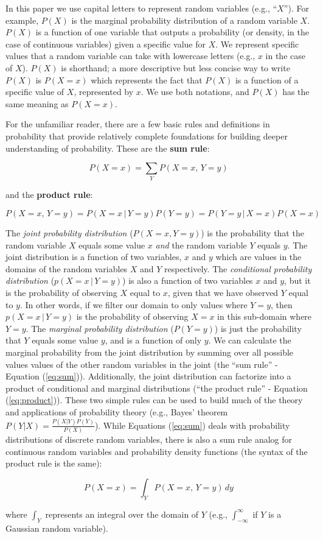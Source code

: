 \documentclass[12pt]{article}
\begin{document}
In this paper we use capital letters to represent random variables
(e.g., ``$X$''). For example, $P(X)$ is the marginal probability distribution
of a random variable $X$. $P(X)$ is a function of one variable that
outputs a probability (or density, in the case of continuous
variables) given a specific value for $X$. We represent specific
values that a random variable can take with lowercase letters (e.g.,
$x$ in the case of $X$). $P(X)$ is shorthand; a more descriptive but
less concise way to write $P(X)$ is $P(X=x)$ which represents the fact
that $P(X)$ is a function of a specific value of $X$, represented by
$x$. We use both notations, and $P(X)$ has the same meaning as
$P(X=x)$.

For the unfamiliar reader, there are a few basic rules and definitions
in probability that provide relatively complete foundations for
building deeper understanding of probability. These are the
\textbf{sum rule}:

\begin{equation} P(X=x) = \sum_Y P(X=x,\, Y=y)
  \label{eq:sum}
\end{equation}

and the \textbf{product rule}:

\begin{equation} P(X=x, \, Y=y) = P(X = x \, | \, Y=y ) P(Y=y) = P(Y =
  y \, | \, X=x ) P(X=x)
  \label{eq:product}
\end{equation}

The \textit{joint probability distribution} ($P(X=x,Y=y)$) is the
probability that the random variable $X$ equals some value $x$
\emph{and} the random variable $Y$ equals $y$. The joint distribution
is a function of two variables, $x$ and $y$ which are values in the
domains of the random variables $X$ and $Y$ respectively. The
\textit{conditional probability distribution} ($p(X = x \, | \, Y=y
)$) is also a function of two variables $x$ and $y$, but it is the
probability of observing $X$ equal to $x$, given that we have observed
$Y$ equal to $y$. In other words, if we filter our domain to only
values where $Y=y$, then $p(X = x \, | \, Y=y )$ is the probability of
observing $X=x$ in this sub-domain where $Y=y$. The \textit{marginal
  probability distribution} ($P(Y=y)$) is just the probability that $Y$
equals some value $y$, and is a function of only $y$. We can calculate
the marginal probability from the joint distribution by summing over
all possible values values of the other random variables in the joint
(the ``sum rule'' - Equation (\ref{eq:sum})). Additionally, the joint
distribution can factorize into a product of conditional and marginal
distributions (``the product rule'' - Equation
(\ref{eq:product})). These two simple rules can be used to build much
of the theory and applications of probability theory (e.g., Bayes'
theorem $P(Y|X) =\frac{P(X|Y) P(Y)}{P(X)}$). While Equations
(\ref{eq:sum}) deals with probability distributions of discrete random
variables, there is also a sum rule analog for continuous random
variables and probability density functions (the syntax of the product
rule is the same):

\begin{equation*} P(X=x) = \int_Y P(X=x,\, Y=y) \, dy
\end{equation*}

where $\int_{Y}$ represents an integral over the domain of $Y$ (e.g.,
$\int_{-\infty}^{\infty}$ if $Y$ is a Gaussian random variable).
\end{document}
